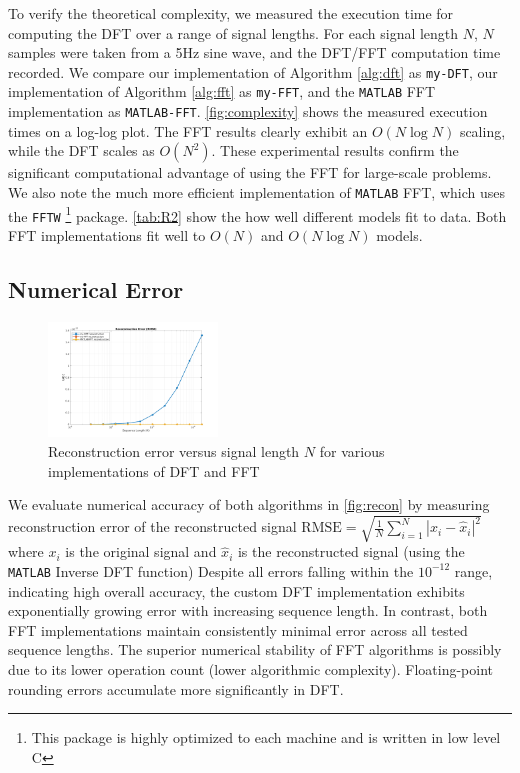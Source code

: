 \documentclass[8pt]{extarticle}
\begin{document}
To verify the theoretical complexity, we measured the execution time for computing the DFT over a range of signal lengths. For each signal length $N$, $N$ samples were taken from a 5Hz sine wave, and the DFT/FFT computation time recorded. We compare our implementation of Algorithm \autoref{alg:dft} as \texttt{my-DFT}, our implementation of Algorithm \autoref{alg:fft} as \texttt{my-FFT}, and the \texttt{MATLAB} FFT implementation as \texttt{MATLAB-FFT}. \autoref{fig:complexity} shows the measured execution times on a log-log plot. The FFT results clearly exhibit an $O(N\log N)$ scaling, while the DFT scales as $O(N^2)$. These experimental results confirm the significant computational advantage of using the FFT for large-scale problems. We also note the much more efficient implementation of \texttt{MATLAB} FFT, which uses the \texttt{FFTW} \footnote{This package is highly optimized to each machine and is written in low level C} package. \autoref{tab:R2} show the how well different models fit to data. Both FFT implementations fit well to $O(N)$ and $O(N\log N)$ models.

\subsection{Numerical Error}

\begin{figure}[h]
    \centering
    \includegraphics[width=0.4\textwidth]{figures/recon.jpg}
    \caption{Reconstruction error versus signal length $N$ for various implementations of DFT and FFT}
    \label{fig:recon}
\end{figure}

We evaluate numerical accuracy of both algorithms in \autoref{fig:recon} by measuring reconstruction error of the reconstructed signal $
\text{RMSE} = \sqrt{\frac{1}{N}\sum_{i=1}^{N}|x_i - \hat{x}_i|^2}$ where $x_i$ is the original signal and $\hat{x}_i$ is the reconstructed signal (using the \texttt{MATLAB} Inverse DFT function) Despite all errors falling within the $10^{-12}$ range, indicating high overall accuracy, the custom DFT implementation exhibits exponentially growing error with increasing sequence length. In contrast, both FFT implementations maintain consistently minimal error across all tested sequence lengths. The superior numerical stability of FFT algorithms is possibly due to its lower operation count (lower algorithmic complexity). Floating-point rounding errors accumulate more significantly in DFT.
\end{document}
